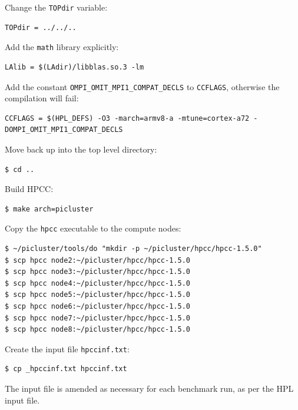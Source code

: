 \documentclass{report}
\begin{document}
Change the \verb|TOPdir| variable:

\lstset{style=hack}
\begin{lstlisting}[caption=Make.picluster]
TOPdir = ../../..
\end{lstlisting}

Add the \verb|math| library explicitly:

\lstset{style=hack}
\begin{lstlisting}[caption=Make.picluster]
LAlib = $(LAdir)/libblas.so.3 -lm
\end{lstlisting}

Add the constant \verb|OMPI_OMIT_MPI1_COMPAT_DECLS| to \verb|CCFLAGS|, otherwise the compilation will fail:

\lstset{style=hack}
\begin{lstlisting}[caption=Make.picluster]
CCFLAGS = $(HPL_DEFS) -O3 -march=armv8-a -mtune=cortex-a72 -DOMPI_OMIT_MPI1_COMPAT_DECLS
\end{lstlisting}

Move back up into the top level directory:

\lstset{style=type}
\begin{lstlisting}
$ cd ..
\end{lstlisting}

Build HPCC:

\lstset{style=type}
\begin{lstlisting}
$ make arch=picluster
\end{lstlisting}

Copy the \verb|hpcc| executable to the compute nodes:

\lstset{style=type}
\begin{lstlisting}
$ ~/picluster/tools/do "mkdir -p ~/picluster/hpcc/hpcc-1.5.0"
$ scp hpcc node2:~/picluster/hpcc/hpcc-1.5.0
$ scp hpcc node3:~/picluster/hpcc/hpcc-1.5.0
$ scp hpcc node4:~/picluster/hpcc/hpcc-1.5.0
$ scp hpcc node5:~/picluster/hpcc/hpcc-1.5.0
$ scp hpcc node6:~/picluster/hpcc/hpcc-1.5.0
$ scp hpcc node7:~/picluster/hpcc/hpcc-1.5.0
$ scp hpcc node8:~/picluster/hpcc/hpcc-1.5.0
\end{lstlisting}

Create the input file \verb|hpccinf.txt|:

\lstset{style=type}
\begin{lstlisting}
$ cp _hpccinf.txt hpccinf.txt
\end{lstlisting}

The input file is amended as necessary for each benchmark run, as per the HPL input file.
\end{document}
